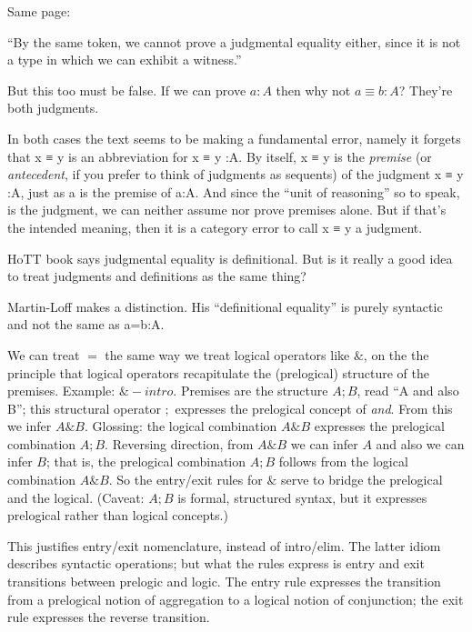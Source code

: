 Same page:

\begin{displayquote}
``By the same token, we cannot prove a judgmental equality
either, since it is not a type in which we can exhibit a witness.''
\end{displayquote}

But this too must be false. If we can prove \(a:A\) then why not
\(a≡b:A\)? They're both judgments.

In both cases the text seems to be making a fundamental error, namely
it forgets that x ≡ y is an abbreviation for x ≡ y :A. By itself, x ≡
y is the \textit{premise} (or \textit{antecedent}, if you prefer to
think of judgments as sequents) of the judgment x ≡ y :A, just as a is
the premise of a:A. And since the ``unit of reasoning'' so to speak,
is the judgment, we can neither assume nor prove premises alone. But
if that's the intended meaning, then it is a category error to call x
≡ y a judgment.

HoTT book says judgmental equality is definitional. But is it really a
good idea to treat judgments and definitions as the same thing?

Martin-Loff makes a distinction. His ``definitional equality'' is
purely syntactic and not the same as a=b:A.

We can treat \(=\) the same way we treat logical operators like
\(\&\), on the the principle that logical operators recapitulate the
(prelogical) structure of the premises. Example: \(\&-intro\).
Premises are the structure \(A ; B\), read ``A and also B''; this
structural operator \(;\) expresses the prelogical concept of
\textit{and}. From this we infer \(A \& B\). Glossing: the logical
combination \(A\&B\) expresses the prelogical combination \(A;B\).
Reversing direction, from \(A\&B\) we can infer \(A\) and also we can
infer \(B\); that is, the prelogical combination \(A;B\) follows from
the logical combination \(A\&B\). So the entry/exit rules for \(\&\)
serve to bridge the prelogical and the logical. (Caveat: \(A;B\) is
formal, structured syntax, but it expresses prelogical rather than
logical concepts.)

This justifies entry/exit nomenclature, instead of intro/elim. The
latter idiom describes syntactic operations; but what the rules
express is entry and exit transitions between prelogic and logic. The
entry rule expresses the transition from a prelogical notion of
aggregation to a logical notion of conjunction; the exit rule expresses
the reverse transition.

